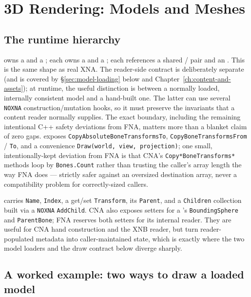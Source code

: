 \chapter{3D Rendering: Models and Meshes}
\label{ch:models-meshes}

\section{The runtime hierarchy}

 owns a  and a ;
each  owns a  and a
; each  references a shared
 /  pair and an . This is the
same shape as real XNA. The reader-side contract is deliberately separate (and is covered by
\S\ref{sec:model-loading} below and Chapter~\ref{ch:content-and-assets}); at runtime, the useful
distinction is between a normally loaded, internally consistent model and a hand-built one.
The latter can use several \texttt{NOXNA} construction/mutation hooks, so it must preserve the
invariants that a content reader normally supplies. The exact boundary, including the remaining
intentional C++ safety deviations from FNA, matters more than a blanket claim of zero gaps.
 exposes \texttt{CopyAbsoluteBoneTransformsTo},
\texttt{CopyBoneTransformsFrom} / \texttt{To}, and a convenience \texttt{Draw(world, view,
projection)}; one small, intentionally-kept deviation from FNA is that CNA's
\texttt{Copy*BoneTransforms*} methods loop by \texttt{Bones.Count} rather than trusting the
caller's array length the way FNA does --- strictly safer against an oversized destination
array, never a compatibility problem for correctly-sized callers.

 carries \texttt{Name}, \texttt{Index}, a get/set \texttt{Transform},
its \texttt{Parent}, and a \texttt{Children} collection built via a \texttt{NOXNA}
\texttt{AddChild}. CNA also exposes setters for a 's
\texttt{BoundingSphere} and \texttt{ParentBone}; FNA reserves both setters for its internal
reader. They are useful for CNA hand construction and the XNB reader, but turn reader-populated
metadata into caller-maintained state, which is exactly where the two model loaders and the
draw contract below diverge sharply.

\section{A worked example: two ways to draw a loaded model}

